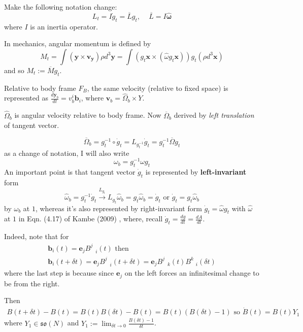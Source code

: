Make the following notation change:
\begin{equation}
L_t = I\dot{g}_t = \overline{L} g_t, \quad \, \overline{L} = I \widehat{\mathbf{\omega}}
\end{equation}
where $I$ is an inertia operator.

In mechanics, angular momentum is defined by 
\[
M_t = \int (\mathbf{y} \times \mathbf{v}_{\mathbf{y}} ) \rho d^3 \mathbf{y} = \int (g_t \mathbf{x} \times (\widehat{\omega} g_t \mathbf{x} ) ) g_t (\rho d^3 \mathbf{x} )
\]
and so $M_t := \overline{M} g_t$.

Relative to body frame $F_B$, the same velocity (relative to fixed space) is represented as $\frac{d\mathbf{y}_b}{dt} = v_b^i \mathbf{b}_i$, where $\mathbf{v}_b = \widehat{\Omega}_b \times Y$.

$\widehat{\Omega}_b$ is angular velocity relative to body frame. Now $\overline{\Omega}_b$ derived by \emph{left translation} of tangent vector. 

\begin{equation}
\overline{\Omega}_b = g^{-1}_t \circ \dot{g}_t = L_{g^{-1}_t} \dot{g}_t = g^{-1}_t \overline{\Omega} g_t
\end{equation}
as a change of notation, I will also write
\[
\omega_b = g^{-1}_t \omega g_t
\]
An important point is that tangent vector $\dot{g}_t$ is represented by \textbf{left-invariant} form
\[
\widehat{\omega}_b = g_t^{-1} \dot{g}_t \xrightarrow{ L_{g_t} } L_{g_t} \widehat{\omega}_b = g_t \widehat{\omega}_b = \dot{g}_t \text{ or } \dot{g}_t = g_t \widehat{\omega}_b
\]
by $\omega_b$ at $1$, whereas it's also represented by right-invariant form $\dot{g}_t = \widehat{\omega} g_t$ with $\widehat{\omega}$ at $1$ in Eqn. (4.17) of  Kambe (2009) \cite{dgdt:TKambe2009}, where, recall $\dot{g}_t = \frac{dg}{dt} = \frac{dA}{dt}$.

Indeed, note that for 
\[
\begin{gathered}
	\mathbf{b}_i(t) = \mathbf{e}_j B^j_{\quad i}(t) \text{ then } \\
	\mathbf{b}_i(t+ \delta t) = \mathbf{e}_j B^j_{\quad i}(t+ \delta t) = \mathbf{e}_j B^j_{\quad k} (t) B^k_{\quad i}(\delta t)
\end{gathered}
\]
where the last step is because since $\mathbf{e}_j$ on the left forces an infinitesimal change to be from the right.

Then 
\[
\begin{gathered}
	B(t+ \delta t) - B(t) = B(t) B(\delta t) - B(t) = B(t) (B(\delta t) - 1) \text{ so } \dot{B}(t) = B(t) Y_1
\end{gathered}
\]
where $Y_1 \in \mathfrak{so}(N)$ and $Y_1 := \lim_{\delta t \to 0} \frac{B(\delta t) - 1 }{ \delta t}$.


